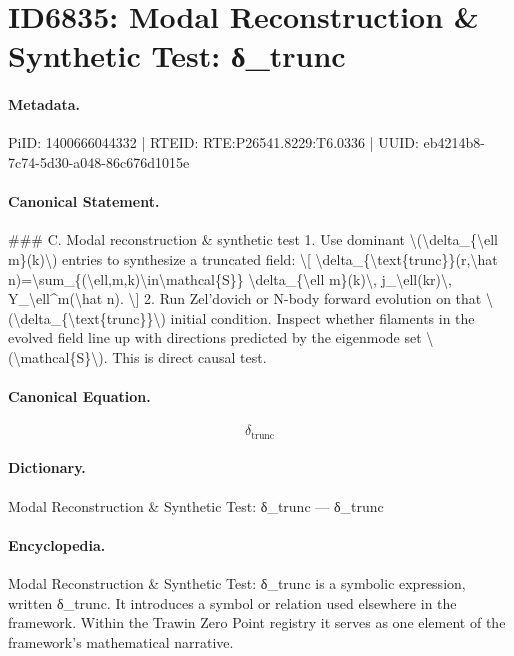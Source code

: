 \section*{ID6835: Modal Reconstruction \& Synthetic Test: δ\_trunc}
\paragraph{Metadata.}
PiID: 1400666044332 | RTEID: RTE:P26541.8229:T6.0336 | UUID: eb4214b8-7c74-5d30-a048-86c676d1015e

\paragraph{Canonical Statement.}
\#\#\# C. Modal reconstruction \& synthetic test 1. Use dominant \textbackslash{}(\textbackslash{}delta\_\{\textbackslash{}ell m\}(k)\textbackslash{}) entries to synthesize a truncated field: \textbackslash{}[ \textbackslash{}delta\_\{\textbackslash{}text\{trunc\}\}(r,\textbackslash{}hat n)=\textbackslash{}sum\_\{(\textbackslash{}ell,m,k)\textbackslash{}in\textbackslash{}mathcal\{S\}\} \textbackslash{}delta\_\{\textbackslash{}ell m\}(k)\textbackslash{}, j\_\textbackslash{}ell(kr)\textbackslash{}, Y\_\textbackslash{}ell\textasciicircum{}m(\textbackslash{}hat n). \textbackslash{}] 2. Run Zel’dovich or N-body forward evolution on that \textbackslash{}(\textbackslash{}delta\_\{\textbackslash{}text\{trunc\}\}\textbackslash{}) initial condition. Inspect whether filaments in the evolved field line up with directions predicted by the eigenmode set \textbackslash{}(\textbackslash{}mathcal\{S\}\textbackslash{}). This is direct causal test.

\paragraph{Canonical Equation.}
\[
\delta_{\text{trunc}}
\]

\paragraph{Dictionary.}
Modal Reconstruction \& Synthetic Test: δ\_trunc — δ\_trunc

\paragraph{Encyclopedia.}
Modal Reconstruction \& Synthetic Test: δ\_trunc is a symbolic expression, written δ\_trunc. It introduces a symbol or relation used elsewhere in the framework. Within the Trawin Zero Point registry it serves as one element of the framework's mathematical narrative.
